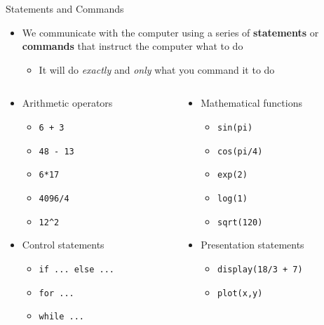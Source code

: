 {}\documentclass[letterpaper,
compress,
xcolor=x11names,
]{beamer}
\begin{document}
\begin{frame}{Statements and Commands}
	\footnotesize
	\begin{itemize}
		\item We communicate with the computer using a series of \textbf{statements} or \textbf{commands} that instruct the computer what to do
		\begin{itemize}
			\item It will do \textit{exactly} and \textit{only} what you command it to do 
		\end{itemize}
	\end{itemize}
	\vspace{0.5cm}
	\begin{columns}
		\begin{column}{0.45\linewidth}
			\begin{itemize}
				\item<2-> Arithmetic operators
				\begin{itemize}
					\item \texttt{6 + 3}
					\item \texttt{48 - 13}
					\item \texttt{6*17}
					\item \texttt{4096/4}
					\item \texttt{12\^{}2}
				\end{itemize}
				\item <4-> Control statements
				\begin{itemize}
					\item \texttt{if ... else ...}
					\item \texttt{for ...}
					\item \texttt{while ...}
				\end{itemize}
				
			\end{itemize}
		\end{column}
		\begin{column}{0.45\linewidth}
			\begin{itemize}
				\item<3-> Mathematical functions 
				\begin{itemize}
					\item \texttt{sin(pi)}
					\item \texttt{cos(pi/4)}
					\item \texttt{exp(2)}
					\item \texttt{log(1)}
					\item \texttt{sqrt(120)}
				\end{itemize}
				\item<5-> Presentation statements 
				\begin{itemize}
					\item \texttt{display(18/3 + 7)}
					\item \texttt{plot(x,y)}
				\end{itemize}
			\end{itemize}
		\end{column}
	\end{columns}
\end{frame}
\end{document}

